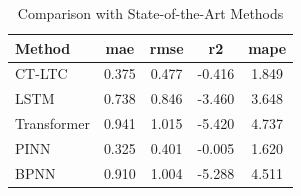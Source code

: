 \begin{table}[htbp]
\centering
\caption{Comparison with State-of-the-Art Methods}
\label{tab:table2_main_results_synthetic}
\begin{tabular}{lcccc}
\toprule
Method & \textbf{mae} & \textbf{rmse} & \textbf{r2} & \textbf{mape} \\
\midrule
CT-LTC & 0.375 & 0.477 & -0.416 & 1.849 \\
LSTM & 0.738 & 0.846 & -3.460 & 3.648 \\
Transformer & 0.941 & 1.015 & -5.420 & 4.737 \\
PINN & 0.325 & 0.401 & -0.005 & 1.620 \\
BPNN & 0.910 & 1.004 & -5.288 & 4.511 \\
\bottomrule
\end{tabular}
\end{table}